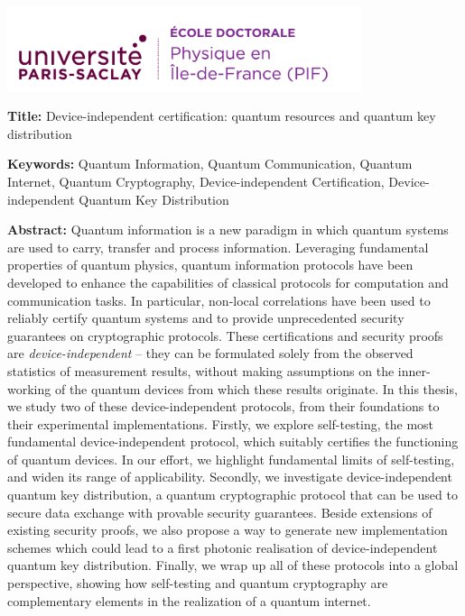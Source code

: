 \documentclass[french,12pt,a4paper]{book}
\begin{document}
\lhead{}
\rhead{}
\rfoot{}
\cfoot{}
\lfoot{}

\noindent 
\includegraphics[height=2.45cm]{Logo/logo_usp_PIF.png}
\vspace{.5cm}
\selectfont

\small

\begin{mdframed}[linecolor=Prune,linewidth=1]
	
	\textbf{Title:} Device-independent certification: quantum resources and quantum key distribution
	
	
	\noindent \textbf{Keywords:} Quantum Information, Quantum Communication, Quantum Internet, Quantum Cryptography, Device-independent Certification, Device-independent Quantum Key Distribution 
	
	\vspace{-.5cm}
	\begin{multicols}{2}
		\noindent \textbf{Abstract:} 
		Quantum information is a new paradigm in which quantum systems are used to carry, transfer and process information.
		Leveraging fundamental properties of quantum physics, quantum information protocols have been developed to enhance the capabilities of classical protocols for computation and communication tasks.
		In particular, non-local correlations have been used to reliably certify quantum systems and to provide unprecedented security guarantees on cryptographic protocols.
		These certifications and security proofs are \textit{device-independent} -- they can be formulated solely from the observed statistics of measurement results, without making assumptions on the inner-working of the quantum devices from which these results originate.
		In this thesis, we study two of these device-independent protocols, from their foundations to their experimental implementations. 
		Firstly, we explore self-testing, the most fundamental device-independent protocol, which suitably certifies the functioning of quantum devices.
		In our effort, we highlight fundamental limits of self-testing, and widen its range of applicability.
		Secondly, we investigate device-independent quantum key distribution, a quantum cryptographic protocol that can be used to secure data exchange with provable security guarantees.
		Beside extensions of existing security proofs, we also propose a way to generate new implementation schemes which could lead to a first photonic realisation of device-independent quantum key distribution.
		Finally, we wrap up all of these protocols into a global perspective, showing how self-testing and quantum cryptography are complementary elements in the realization of a quantum internet.
	\end{multicols}
\end{mdframed}
\end{document}
